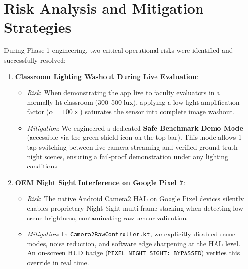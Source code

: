 \section{Risk Analysis and Mitigation Strategies}
During Phase 1 engineering, two critical operational risks were identified and successfully resolved:
\begin{enumerate}
    \item \textbf{Classroom Lighting Washout During Live Evaluation}:
    \begin{itemize}
        \item \textit{Risk}: When demonstrating the app live to faculty evaluators in a normally lit classroom (300--500 lux), applying a low-light amplification factor ($\alpha = 100\times$) saturates the sensor into complete image washout.
        \item \textit{Mitigation}: We engineered a dedicated \textbf{Safe Benchmark Demo Mode} (accessible via the green shield icon on the top bar). This mode allows 1-tap switching between live camera streaming and verified ground-truth night scenes, ensuring a fail-proof demonstration under any lighting conditions.
    \end{itemize}
    \item \textbf{OEM Night Sight Interference on Google Pixel 7}:
    \begin{itemize}
        \item \textit{Risk}: The native Android Camera2 HAL on Google Pixel devices silently enables proprietary Night Sight multi-frame stacking when detecting low scene brightness, contaminating raw sensor validation.
        \item \textit{Mitigation}: In \texttt{Camera2RawController.kt}, we explicitly disabled scene modes, noise reduction, and software edge sharpening at the HAL level. An on-screen HUD badge (\texttt{PIXEL NIGHT SIGHT: BYPASSED}) verifies this override in real time.
    \end{itemize}
\end{enumerate}

